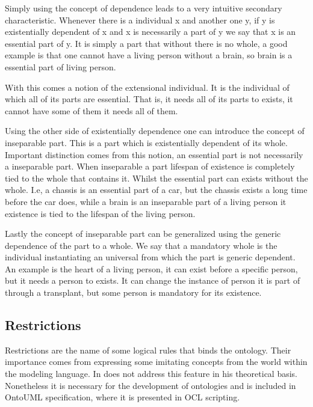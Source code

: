 Simply using the concept of dependence leads to a very intuitive secondary characteristic. Whenever there is a individual x and another one y, if y is existentially dependent of x and x is necessarily a part of y we say that x is an essential part of y. It is simply a part that without there is no whole, a good example is that one cannot have a living person without a brain, so brain is a essential part of living person. 

With this comes a notion of the extensional individual. It is the individual of which all of its parts are essential. That is, it needs all of its parts to exists, it cannot have some of them it needs all of them.

Using the other side of existentially dependence one can introduce the concept of inseparable part. This is a part which is existentially dependent of its whole. Important distinction comes from this notion, an essential part is not necessarily a inseparable part. When inseparable a part lifespan of existence is completely tied to the whole that contains it. Whilst the essential part can exists without the whole. I.e, a chassis is an essential part of a car, but the chassis exists a long time before the car does, while a brain is an inseparable part of a living person it existence is tied to the lifespan of the living person.

Lastly the concept of inseparable part can be generalized using the generic dependence of the part to a whole. We say that a mandatory whole is the individual instantiating an universal from which the part is generic dependent. An example is the heart of a living person, it can exist before a specific person, but it needs a person to exists. It can change the instance of person it is part of through a transplant, but some person is mandatory for its existence.

\subsection{Restrictions}

Restrictions are the name of some logical rules that binds the ontology. Their importance comes from expressing some imitating concepts from the world within the modeling language. In \cite{guizzardi_ontological_2005} does not address this feature in his theoretical basis. Nonetheless it is necessary for the development of ontologies and is included in OntoUML specification, where it is presented in OCL scripting. \citep{guizzardi_ontoUML_2004}


